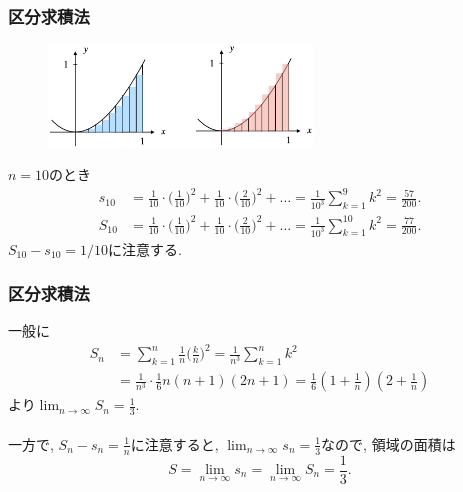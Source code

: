\documentclass[dvipdfmx,cjk,10.2pt]{beamer}
\theoremstyle{definition}
\begin{document}
\begin{frame}
\frametitle{区分求積法}


\begin{figure}[htbp]
 \begin{center} 
  \includegraphics[width=70mm]{RiemannSum2.png}
 \end{center}
\end{figure}

\vspace{-3mm}

$n=10$のとき
{\small 
\begin{align*}
s_{10} &= \frac{1}{10} \cdot \big(\frac{1}{10}\big)^2+\frac{1}{10} \cdot \big(\frac{2}{10}\big)^2+\dots 
= \frac{1}{10^3}\sum_{k=1}^9 k^2=\frac{57}{200}. \\
S_{10} &= \frac{1}{10} \cdot \big(\frac{1}{10}\big)^2+\frac{1}{10} \cdot \big(\frac{2}{10}\big)^2+\dots 
= \frac{1}{10^3}\sum_{k=1}^{10} k^2=\frac{77}{200}. 
\end{align*}
}
$S_{10}-s_{10}=1/10$に注意する. 
\end{frame}




\begin{frame}
\frametitle{区分求積法}

一般に
\begin{align*}
S_n &= \sum_{k=1}^n  \frac{1}{n} \big(\frac{k}{n}\big)^2 = \frac{1}{n^3}  \sum_{k=1}^n k^2 \\
& =  \frac{1}{n^3} \cdot  \frac{1}{6}n(n+1)(2n+1) = \frac{1}{6} (1+\frac{1}{n})(2+\frac{1}{n})
\end{align*}
より$\displaystyle \lim_{n\to \infty}S_n=\frac{1}{3}$. \\
\ \\

一方で, $S_n-s_n=\frac{1}{n}$に注意すると, $\displaystyle \lim_{n\to \infty}s_n=\frac{1}{3}$なので, 
領域の面積は
$$
S= \lim_{n\to \infty}s_n=\lim_{n\to \infty}S_n=\frac{1}{3}.
$$ 

\end{frame}
\end{document}
